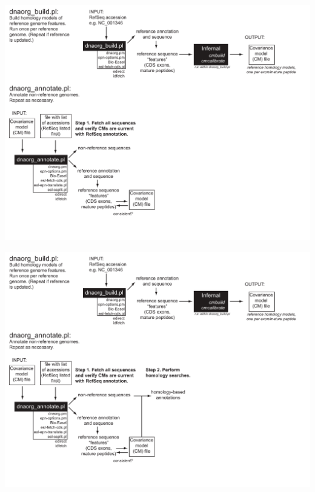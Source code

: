 \documentclass[landscape]{slides}
\begin{document}
\begin{slide}
\includegraphics[width=10in]{figs/dnaorg-scripts-annotate2}
\vfill
\end{slide}
\begin{slide}
\includegraphics[width=10in]{figs/dnaorg-scripts-annotate3}
\vfill
\end{slide}
\end{document}
